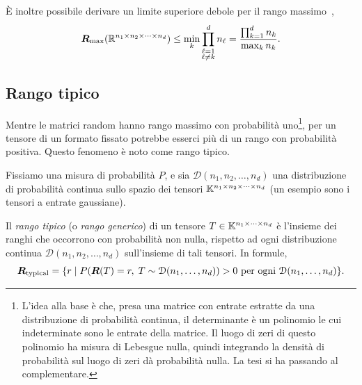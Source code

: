 È inoltre possibile derivare un limite superiore debole per il rango massimo~\cite[Pag. 275]{BK25},
\begin{equation}
	\label{eq:weak_upper_bound_max_rank}
	\bm{R}_{\text{max}}(\mathbb{R}^{n_1 \times n_2 \times \cdots \times n_d}) \le \min_k \prod_{\substack{\ell=1 \\ \ell \neq k}}^d n_\ell = \frac{\prod_{k=1}^d n_k}{\max_k n_k}.
\end{equation}



\subsection*{Rango tipico}
\label{sec:rango_tipico}

Mentre le matrici random hanno rango massimo con probabilità uno\footnote{L'idea alla base è che, presa una matrice
	con entrate estratte da una distribuzione di probabilità continua, il
	determinante è un polinomio le cui indeterminate sono le entrate della matrice. Il luogo di
	zeri di questo polinomio ha misura di Lebesgue nulla, quindi integrando la densità di probabilità
	sul luogo di zeri dà probabilità nulla. La tesi si ha passando al complementare.}, per un tensore di un
formato fissato potrebbe esserci più di un rango con probabilità positiva. Questo fenomeno è noto come rango tipico.

Fissiamo una misura di probabilità $ P $, e sia $ \mathcal{D}(n_1, n_2, \ldots, n_{d})$ una distribuzione di probabilità continua sullo spazio
dei tensori $ \mathbb{K}^{n_1 \times n_2 \times \cdots \times n_{d}} $ (un esempio sono i tensori a entrate
gaussiane).
\begin{definition}
	Il \emph{rango tipico} (o \emph{rango generico}) di un tensore $ T \in \mathbb{K}^{n_1 \times \cdots
			\times n_{d}} $ è l'insieme dei ranghi che occorrono con probabilità non nulla, rispetto ad
	ogni distribuzione continua $  \mathcal{D}(n_1, n_2, \ldots, n_{d})$ sull'insieme di tali tensori.
	In formule,
	\begin{equation*}
		\rk_{\text{typical}} = \{r \mid P \left( \rk(T) = r, \; T \sim \mathcal{D}(n_1, \ldots,
			n_{d})\right) > 0 \text{ per ogni } \mathcal{D}(n_1, \ldots,
		n_{d})\}.
	\end{equation*}
\end{definition}

